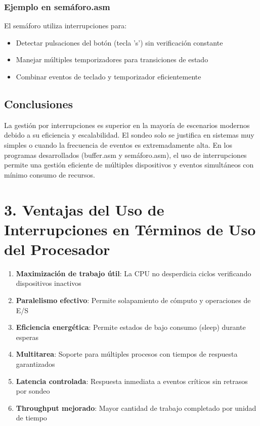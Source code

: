 \documentclass[12pt]{article}
\begin{document}
\subsubsection*{Ejemplo en semáforo.asm}
El semáforo utiliza interrupciones para:
\begin{itemize}
    \item Detectar pulsaciones del botón (tecla 's') sin verificación constante
    \item Manejar múltiples temporizadores para transiciones de estado
    \item Combinar eventos de teclado y temporizador eficientemente
\end{itemize}

\subsection*{Conclusiones}
La gestión por interrupciones es superior en la mayoría de escenarios modernos debido a su eficiencia y escalabilidad. El sondeo solo se justifica en sistemas muy simples o cuando la frecuencia de eventos es extremadamente alta. En los programas desarrollados (buffer.asm y semáforo.asm), el uso de interrupciones permite una gestión eficiente de múltiples dispositivos y eventos simultáneos con mínimo consumo de recursos.

\section*{3. Ventajas del Uso de Interrupciones en Términos de Uso del Procesador}
\begin{enumerate}
    \item \textbf{Maximización de trabajo útil}: La CPU no desperdicia ciclos verificando dispositivos inactivos
    \item \textbf{Paralelismo efectivo}: Permite solapamiento de cómputo y operaciones de E/S
    \item \textbf{Eficiencia energética}: Permite estados de bajo consumo (sleep) durante esperas
    \item \textbf{Multitarea}: Soporte para múltiples procesos con tiempos de respuesta garantizados
    \item \textbf{Latencia controlada}: Respuesta inmediata a eventos críticos sin retrasos por sondeo
    \item \textbf{Throughput mejorado}: Mayor cantidad de trabajo completado por unidad de tiempo
\end{enumerate}
\end{document}
